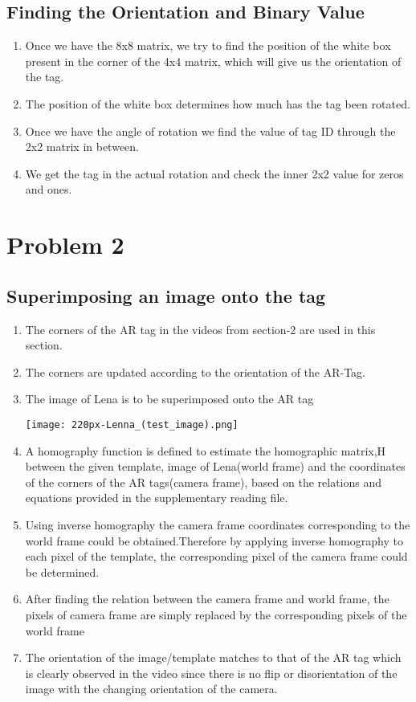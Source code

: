 \documentclass{article}
\begin{document}
\subsection{Finding the Orientation and Binary Value}
\begin{enumerate}
    \item Once we have the 8x8 matrix, we try to find the position of the white box present in the corner of the
4x4 matrix, which will give us the orientation of the tag.
    \item The position of the white box determines how much has the tag been rotated.
    \item  Once we have the angle of rotation we find the value of tag ID through the 2x2 matrix in between.
    \item  We get the tag in the actual rotation and check the inner 2x2 value for zeros and ones.
\end{enumerate}

\section{Problem 2}

\subsection{Superimposing an image onto the tag}
\begin{enumerate}
    \item  The corners of the AR tag in the videos from section-2 are used in this section.
    \item  The corners are updated according to the orientation of the AR-Tag.
    \item  The image of Lena is to be superimposed onto the AR tag
    \begin{center}

    \texttt{[image: 220px-Lenna\_(test\_image).png]}

    
\end{center}
    \item A homography function is defined to estimate the homographic matrix,H between the given template,
image of Lena(world frame) and the coordinates of the corners of the AR tags(camera frame), based
on the relations and equations provided in the supplementary reading file.
    \item Using inverse homography the camera frame coordinates corresponding to the world frame could be
obtained.Therefore by applying inverse homography to each pixel of the template, the corresponding pixel
of the camera frame could be determined.
    \item After finding the relation between the camera frame and world frame, the pixels of camera frame are
simply replaced by the corresponding pixels of the world frame
    \item The orientation of the image/template matches to that of the AR tag which is clearly observed in the
video since there is no flip or disorientation of the image with the changing orientation of the camera.
\end{enumerate}
\end{document}
